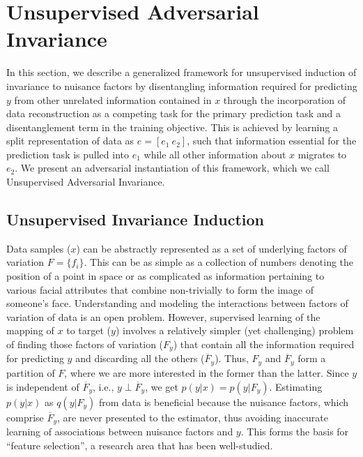 \section{Unsupervised Adversarial Invariance}
\label{sec:uaif}


In this section, we describe a generalized framework for unsupervised induction of invariance to nuisance factors by disentangling information required for predicting $y$ from other unrelated information contained in $x$ through the incorporation of data reconstruction as a competing task for the primary prediction task and a disentanglement term in the training objective. This is achieved by learning a split representation of data as $e = [e_1 \ e_2]$, such that information essential for the prediction task is pulled into $e_1$ while all other information about $x$ migrates to $e_2$. We present an adversarial instantiation of this framework, which we call Unsupervised Adversarial Invariance.

\subsection{Unsupervised Invariance Induction}
\label{sec:uaif_gen}

Data samples ($x$) can be abstractly represented as a set of underlying factors of variation $F = \{f_i\}$. This can be as simple as a collection of numbers denoting the position of a point in space or as complicated as information pertaining to various facial attributes that combine non-trivially to form the image of someone's face. Understanding and modeling the interactions between factors of variation of data is an open problem. However, supervised learning of the mapping of $x$ to target ($y$) involves a relatively simpler (yet challenging) problem of finding those factors of variation ($F_y$) that contain all the information required for predicting $y$ and discarding all the others ($\overline{F}_y$). Thus, $F_y$ and $\overline{F}_y$ form a partition of $F$, where we are more interested in the former than the latter. Since $y$ is independent of $\overline{F}_y$, i.e., $y \perp \overline{F}_y$, we get $p(y|x) = p(y|F_y)$. Estimating $p(y|x)$ as $q(y|F_y)$ from data is beneficial because the nuisance factors, which comprise $\overline{F}_y$, are never presented to the estimator, thus avoiding inaccurate learning of associations between nuisance factors and $y$. This forms the basis for ``feature selection'', a research area that has been well-studied.

